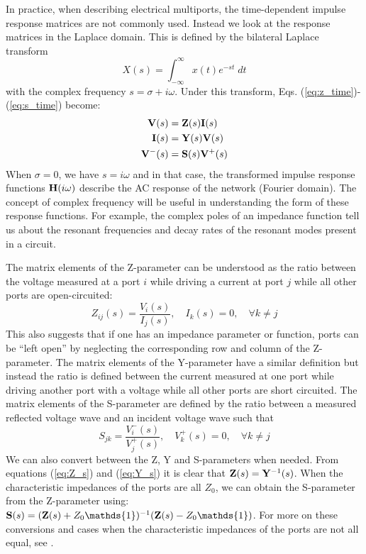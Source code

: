 In practice, when describing electrical multiports, the time-dependent impulse response matrices are not commonly used. Instead we look at the response matrices in the Laplace domain. This is defined by the bilateral Laplace transform
\begin{equation}
    X(s) = \int_{-\infty}^{\infty} x(t) e^{-st}\; dt
\end{equation}
with the complex frequency $s=\sigma + i\omega$. Under this transform, Eqs. (\ref{eq:z_time})-(\ref{eq:s_time}) become:
\begin{align}
    \label{eq:Z_s}\vb{V}(s) &= \vb{Z}(s)\vb{I}(s) \\
    \label{eq:Y_s}\vb{I}(s) &= \vb{Y}(s)\vb{V}(s) \\
    \label{eq:S_s}\vb{V}^-(s) &= \vb{S}(s)\vb{V}^+(s) 
\end{align}
When $\sigma=0$, we have $s=i\omega$ and in that case, the transformed impulse response functions $\vb{H}(i\omega)$ describe the AC response of the network (Fourier domain). The concept of complex frequency will be useful in understanding the form of these response functions. For example, the complex poles of an impedance function tell us about the resonant frequencies and decay rates of the resonant modes present in a circuit. 

The matrix elements of the Z-parameter can be understood as the ratio between the voltage measured at a port $i$ while driving a current at port $j$ while all other ports are open-circuited:
\begin{equation}
    Z_{ij}(s) = \frac{V_i(s)}{I_j(s)}, \quad I_k(s)=0, \quad\forall k\neq j
\end{equation}
This also suggests that if one has an impedance parameter or function, ports can be ``left open'' by neglecting the corresponding row and column of the Z-parameter. The matrix elements of the Y-parameter have a similar definition but instead the ratio is defined between the current measured at one port while driving another port with a voltage while all other ports are short circuited. The matrix elements of the S-parameter are defined by the ratio between a measured reflected voltage wave and an incident voltage wave such that
\begin{equation}
    S_{jk} = \frac{V^-_i(s)}{V^+_j(s)}, \quad V^+_k(s)=0, \quad\forall k\neq j
\end{equation}
We can also convert between the Z, Y and S-parameters when needed. From equations (\ref{eq:Z_s}) and (\ref{eq:Y_s}) it is clear that $\vb{Z}(s)=\vb{Y}^{-1}(s)$. When the characteristic impedances of the ports are all $Z_0$, we can obtain the S-parameter from the Z-parameter using: $\vb{S}(s) = (\vb{Z}(s) + Z_0\mathds{1})^{-1} (\vb{Z}(s) - Z_0\mathds{1}) $. For more on these conversions and cases when the characteristic impedances of the ports are not all equal, see \cite[Chapter 4]{Pozar_2011}.

